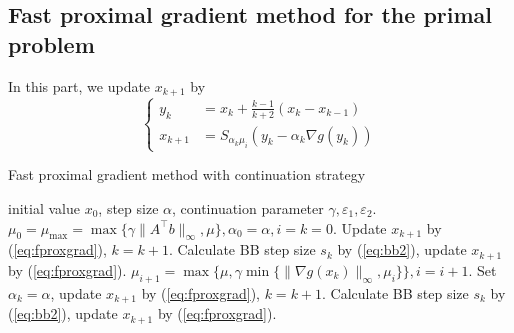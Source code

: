 \documentclass{article}
\numberwithin{equation}{section}
\numberwithin{figure}{section}
\begin{document}
\subsection{Fast proximal gradient method for the primal problem}
In this part, we update $x_{k+1}$ by
\begin{equation}
\begin{cases}
y_k &= x_k+\frac{k-1}{k+2}(x_k-x_{k-1})\\
x_{k+1}&=S_{\alpha_k \mu_i}(y_k-\alpha_k \nabla g(y_k))
\end{cases}
    \label{eq:fproxgrad}
\end{equation}
\begin{algorithm}[!htbp]\caption{Fast proximal gradient method with continuation strategy}\label{alg:fproxgrad}
\begin{algorithmic}[1]
 initial value $x_0$, step size $\alpha$, continuation parameter $\gamma, \varepsilon_1, \varepsilon_2$.
\STATE $\mu_0=\mu_{\max}=\max\{\gamma\|A^\top b\|_\infty,\mu\},\alpha_0=\alpha, i = k=0$.
\STATE Update $x_{k+1}$ by (\ref{eq:fproxgrad}), $k = k+1$.
\STATE Calculate BB step size $s_k$ by (\ref{eq:bb2}), update $x_{k+1}$ by (\ref{eq:fproxgrad}).
\ENDFOR
\STATE $\mu_{i+1}=\max\{\mu, \gamma\min\{\|\nabla g(x_k)\|_\infty, \mu_i\} \},  i = i+1$.
\STATE Set $\alpha_k = \alpha$, update $x_{k+1}$ by (\ref{eq:fproxgrad}), $k=k+1$.
\ENDWHILE
{}
\STATE Calculate BB step size $s_k$ by (\ref{eq:bb2}), update $x_{k+1}$ by (\ref{eq:fproxgrad}).
\ENDFOR
\end{algorithmic}
\end{algorithm}
\end{document}
